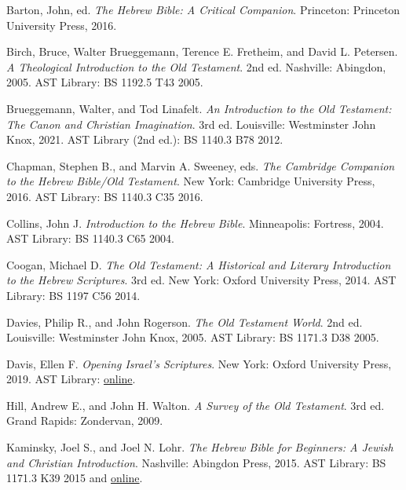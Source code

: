 \documentclass[titlepage]{article}
\begin{document}
\begingroup
\renewcommand{\section}[2]{}%
\begin{thebibliography}{99}%

	 Barton, John, ed.
	\emph{The Hebrew Bible: A Critical Companion}.
	Princeton: Princeton University Press, 2016.

	 Birch, Bruce, Walter Brueggemann, Terence E. Fretheim, and David L. Petersen.
	\emph{A Theological Introduction to the Old Testament}.
	2nd ed. Nashville: Abingdon, 2005.
	AST Library: BS 1192.5 T43 2005.

	 Brueggemann, Walter, and Tod Linafelt.
	\emph{An Introduction to the Old Testament: The Canon and Christian Imagination}.
	3rd ed. Louisville: Westminster John Knox, 2021.
	AST Library (2nd ed.): BS 1140.3 B78 2012.

	 Chapman, Stephen B., and Marvin A. Sweeney, eds.
	\emph{The Cambridge Companion to the Hebrew Bible/Old Testament}.
	New York: Cambridge University Press, 2016.
	AST Library: BS 1140.3 C35 2016.

	 Collins, John J.
	\emph{Introduction to the Hebrew Bible}.
	Minneapolis: Fortress, 2004.
	AST Library: BS 1140.3 C65 2004.

	 Coogan, Michael D.
	\emph{The Old Testament: A Historical and Literary Introduction to the Hebrew Scriptures}.
	3rd ed. New York: Oxford University Press, 2014.
	AST Library: BS 1197 C56 2014.

	 Davies, Philip R., and John Rogerson.
	\emph{The Old Testament World}.
	2nd ed. Louisville: Westminster John Knox, 2005.
	AST Library: BS 1171.3 D38 2005.

	 Davis, Ellen F.
	\emph{Opening Israel's Scriptures}.
	New York: Oxford University Press, 2019.
	AST Library: \href{https://doi.org/10.1093/oso/9780190260545.001.0001}{online}.

	 Hill, Andrew E., and John H. Walton.
	\emph{A Survey of the Old Testament}.
	3rd ed. Grand Rapids: Zondervan, 2009.

	 Kaminsky, Joel S., and Joel N. Lohr.
	\emph{The Hebrew Bible for Beginners: A Jewish and Christian Introduction}.
	Nashville: Abingdon Press, 2015.
	AST Library: BS 1171.3 K39 2015 and \href{https://search.ebscohost.com/login.aspx?direct=true&AuthType=cookie,ip,shib&db=nlebk&AN=969753&site=ehost-live&scope=site&custid=s5315951}{online}.


\end{thebibliography}
\end{document}
